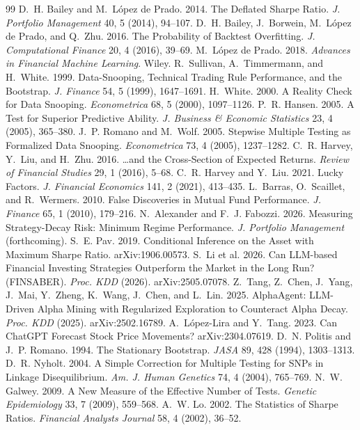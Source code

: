 \documentclass[sigconf]{acmart}
\begin{document}

\begin{thebibliography}{99}
\small
{} D.~H. Bailey and M.~L\'opez de Prado. 2014. The Deflated Sharpe Ratio. \emph{J. Portfolio Management} 40, 5 (2014), 94--107.
 D.~H. Bailey, J.~Borwein, M.~L\'opez de Prado, and Q.~Zhu. 2016. The Probability of Backtest Overfitting. \emph{J. Computational Finance} 20, 4 (2016), 39--69.
 M.~L\'opez de Prado. 2018. \emph{Advances in Financial Machine Learning}. Wiley.
 R.~Sullivan, A.~Timmermann, and H.~White. 1999. Data-Snooping, Technical Trading Rule Performance, and the Bootstrap. \emph{J. Finance} 54, 5 (1999), 1647--1691.
 H.~White. 2000. A Reality Check for Data Snooping. \emph{Econometrica} 68, 5 (2000), 1097--1126.
 P.~R. Hansen. 2005. A Test for Superior Predictive Ability. \emph{J. Business \& Economic Statistics} 23, 4 (2005), 365--380.
 J.~P. Romano and M.~Wolf. 2005. Stepwise Multiple Testing as Formalized Data Snooping. \emph{Econometrica} 73, 4 (2005), 1237--1282.
 C.~R. Harvey, Y.~Liu, and H.~Zhu. 2016. \ldots and the Cross-Section of Expected Returns. \emph{Review of Financial Studies} 29, 1 (2016), 5--68.
 C.~R. Harvey and Y.~Liu. 2021. Lucky Factors. \emph{J. Financial Economics} 141, 2 (2021), 413--435.
 L.~Barras, O.~Scaillet, and R.~Wermers. 2010. False Discoveries in Mutual Fund Performance. \emph{J. Finance} 65, 1 (2010), 179--216.
 N.~Alexander and F.~J. Fabozzi. 2026. Measuring Strategy-Decay Risk: Minimum Regime Performance. \emph{J. Portfolio Management} (forthcoming).
 S.~E. Pav. 2019. Conditional Inference on the Asset with Maximum Sharpe Ratio. arXiv:1906.00573.
 S.~Li et al. 2026. Can LLM-based Financial Investing Strategies Outperform the Market in the Long Run? (FINSABER). \emph{Proc. KDD} (2026). arXiv:2505.07078.
 Z.~Tang, Z.~Chen, J.~Yang, J.~Mai, Y.~Zheng, K.~Wang, J.~Chen, and L.~Lin. 2025. AlphaAgent: LLM-Driven Alpha Mining with Regularized Exploration to Counteract Alpha Decay. \emph{Proc. KDD} (2025). arXiv:2502.16789.
 A.~L\'opez-Lira and Y.~Tang. 2023. Can ChatGPT Forecast Stock Price Movements? arXiv:2304.07619.
 D.~N. Politis and J.~P. Romano. 1994. The Stationary Bootstrap. \emph{JASA} 89, 428 (1994), 1303--1313.
 D.~R. Nyholt. 2004. A Simple Correction for Multiple Testing for SNPs in Linkage Disequilibrium. \emph{Am. J. Human Genetics} 74, 4 (2004), 765--769.
 N.~W. Galwey. 2009. A New Measure of the Effective Number of Tests. \emph{Genetic Epidemiology} 33, 7 (2009), 559--568.
 A.~W. Lo. 2002. The Statistics of Sharpe Ratios. \emph{Financial Analysts Journal} 58, 4 (2002), 36--52.
\end{thebibliography}
\end{document}
